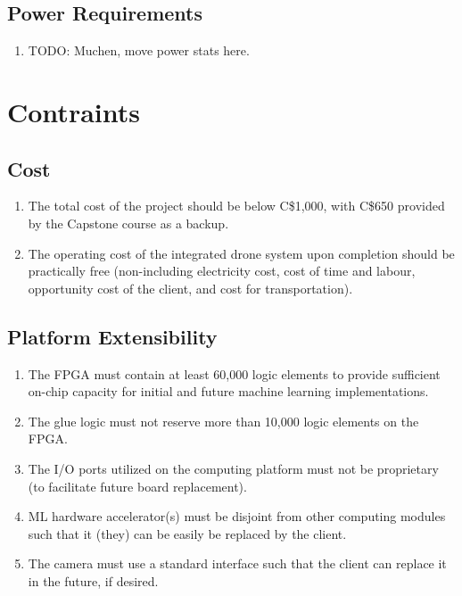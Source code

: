 \documentclass[10pt,letterpaper]{article}
\begin{document}
\subsection{Power Requirements}
\begin{enumerate}[label=NF.PR.\arabic*, wide=1cm, widest=3cm, leftmargin=*, font=\bfseries, noitemsep,topsep=0pt, parsep=4pt, partopsep=0pt]

\item TODO: Muchen, move power stats here.

\end{enumerate}




\section{Contraints}


\subsection{Cost}
\begin{enumerate}[label=C.CT.\arabic*, wide=1cm, widest=3cm, leftmargin=*, font=\bfseries, noitemsep,topsep=0pt, parsep=4pt, partopsep=0pt]
    \item The total cost of the project should be below C\$1,000, with C\$650 provided by the Capstone course as a backup.
    \item The operating cost of the integrated drone system upon completion should be practically free (non-including electricity cost, cost of time and labour, opportunity cost of the client, and cost for transportation).
\end{enumerate}

\subsection{Platform Extensibility}
\begin{enumerate}[label=C.EX.\arabic*, wide=1cm, widest=3cm, leftmargin=*, font=\bfseries, noitemsep,topsep=0pt, parsep=4pt, partopsep=0pt]
    \item The FPGA must contain at least 60,000 logic elements to provide sufficient on-chip capacity for initial and future machine learning implementations.
    \item The glue logic must not reserve more than 10,000 logic elements on the FPGA.
    \item The I/O ports utilized on the computing platform must not be proprietary (to facilitate future board replacement).
    \item ML hardware accelerator(s) must be disjoint from other computing modules such that it (they) can be easily be replaced by the client.
    \item The camera must use a standard interface such that the client can replace it in the future, if desired.
\end{enumerate}
\end{document}
